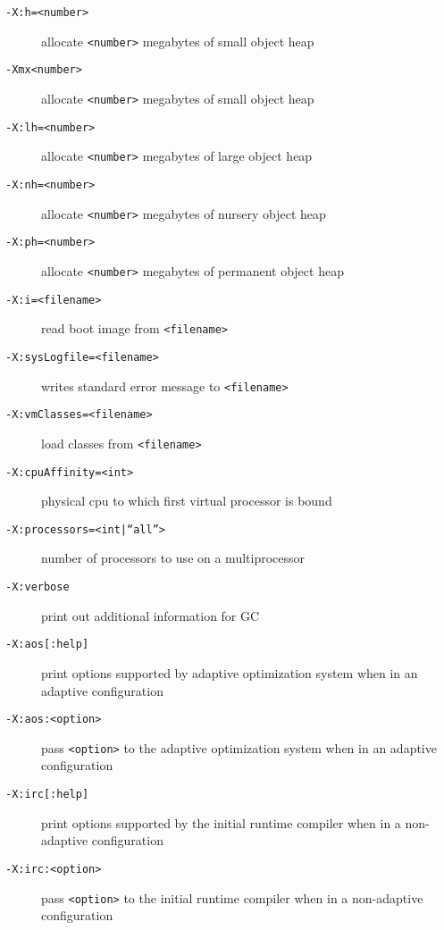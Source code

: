 \begin{description}
\item[{\tt -X:h=<number>}]
allocate {\tt <number>} megabytes of small object heap

\item[{\tt -Xmx<number>}]
allocate {\tt <number>} megabytes of small object heap

\item[{\tt -X:lh=<number>}]
allocate {\tt <number>} megabytes of large object heap

\item[{\tt -X:nh=<number>}]
allocate {\tt <number>} megabytes of nursery object heap 

\item[{\tt -X:ph=<number>}]
allocate {\tt <number>} megabytes of permanent object heap 

\item[{\tt -X:i=<filename>}]
read boot image from {\tt <filename>}

\item[{\tt -X:sysLogfile=<filename>}]
writes standard error message to {\tt <filename>}

\item[{\tt -X:vmClasses=<filename>}]
load classes from {\tt <filename>}

\item[{\tt -X:cpuAffinity=<int>}]
physical cpu to which first virtual processor is bound

\item[{\tt -X:processors=<int|``all''>}]
number of processors to use on a multiprocessor

\item[{\tt -X:verbose}]
print out additional information for GC

\item[{\tt -X:aos[:help]}]
print options supported by adaptive optimization system when in an
adaptive configuration

\item[{\tt -X:aos:<option>}]
pass {\tt <option>} to the adaptive optimization system when in an adaptive configuration

\item[{\tt -X:irc[:help]}]
print options supported by the initial runtime compiler when in a non-adaptive
configuration 

\item[{\tt -X:irc:<option>}]
pass {\tt <option>} to the initial runtime compiler when in a non-adaptive configuration 


\end{description}
